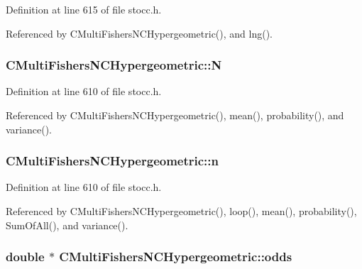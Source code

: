 Definition at line 615 of file stocc.\-h.



Referenced by C\-Multi\-Fishers\-N\-C\-Hypergeometric(), and lng().

\subsubsection[{N}]{ C\-Multi\-Fishers\-N\-C\-Hypergeometric\-::\-N\hspace{0.3cm}{\ttfamily [protected]}}\label{class_c_multi_fishers_n_c_hypergeometric_ad0defe6444379e76faf467fb9ad16b97}


Definition at line 610 of file stocc.\-h.



Referenced by C\-Multi\-Fishers\-N\-C\-Hypergeometric(), mean(), probability(), and variance().

\subsubsection[{n}]{ C\-Multi\-Fishers\-N\-C\-Hypergeometric\-::n\hspace{0.3cm}{\ttfamily [protected]}}\label{class_c_multi_fishers_n_c_hypergeometric_ac1e44a02c6da60fdd7be50100953bf25}


Definition at line 610 of file stocc.\-h.



Referenced by C\-Multi\-Fishers\-N\-C\-Hypergeometric(), loop(), mean(), probability(), Sum\-Of\-All(), and variance().

\subsubsection[{odds}]{\setlength{\rightskip}{0pt plus 5cm}double $\ast$ C\-Multi\-Fishers\-N\-C\-Hypergeometric\-::odds\hspace{0.3cm}{\ttfamily [protected]}}\label{class_c_multi_fishers_n_c_hypergeometric_a339e52354d94a9d5f5592e283039bccb}


